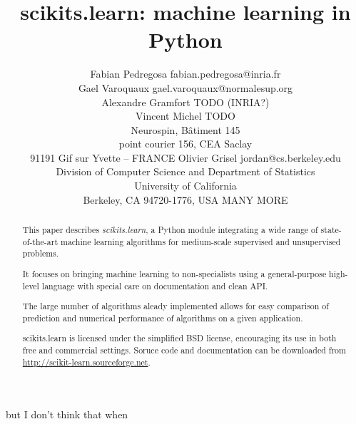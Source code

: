 \documentclass[twoside,11pt]{article}
\begin{document}
\title{scikits.learn: machine learning in Python}


\author{\name Fabian Pedregosa \email fabian.pedregosa@inria.fr \\
        \name Gael Varoquaux \email gael.varoquaux@normalesup.org  \\
        \name Alexandre Gramfort \email TODO (INRIA?)\\
        \name Vincent Michel  \email TODO \\
       \addr  Neurospin, Bâtiment 145\\
       point courier 156, CEA Saclay\\
       91191 Gif sur Yvette – FRANCE
       \AND
       \name Olivier Grisel \email jordan@cs.berkeley.edu \\
       \addr Division of Computer Science and Department of Statistics\\
       University of California\\
       Berkeley, CA 94720-1776, USA
       \AND
       \name MANY MORE
}



\maketitle

\begin{abstract}
This paper describes \emph{scikits.learn}, a Python module integrating
a wide range of state-of-the-art machine learning algorithms for
medium-scale supervised and unsupervised problems. 


It focuses on bringing machine learning to non-specialists using a
general-purpose high-level language with special care on documentation
and clean API.

The large number of algorithms aleady implemented allows for easy
comparison of prediction and numerical performance of algorithms on a
given application.


scikits.learn is licensed under the simplified BSD license,
encouraging its use in both free and commercial settings. Soruce code
and documentation can be downloaded from
\url{http://scikit-learn.sourceforge.net}.

\end{abstract}

but I don't think that when 



\end{document}
